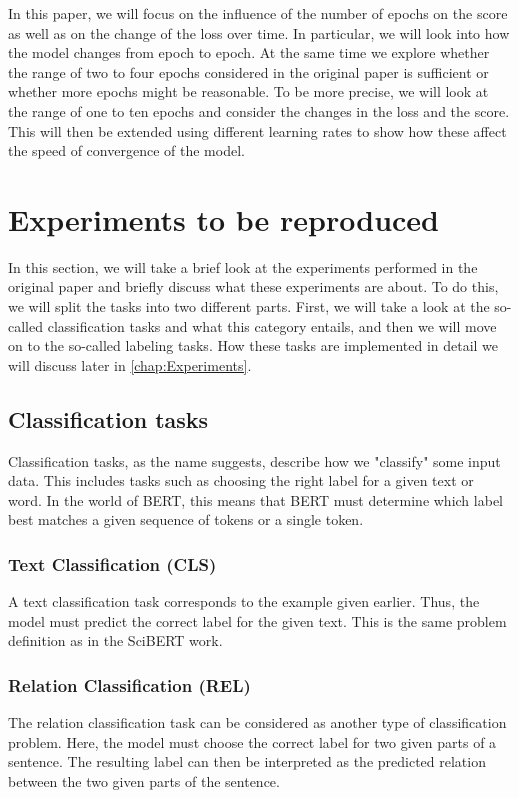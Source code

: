 \color{red}
In this paper, we will focus on the influence of the number of epochs on the score as well as on the change of the loss over time. In particular, we will look into how the model changes from epoch to epoch. At the same time we explore whether the range of two to four epochs considered in the original paper is sufficient or whether more epochs might be reasonable. To be more precise, we will look at the range of one to ten epochs and consider the changes in the loss and the score. This will then be extended using different learning rates to show how these affect the speed of convergence of the model. 
\color{black}

\section{Experiments to be reproduced}
In this section, we will take a brief look at the experiments performed in the original paper and briefly discuss what these experiments are about. To do this, we will split the tasks into two different parts. First, we will take a look at the so-called classification tasks and what this category entails, and then we will move on to the so-called labeling tasks. How these tasks are implemented in detail we will discuss later in \autoref{chap:Experiments}.
\subsection{Classification tasks}
Classification tasks, as the name suggests, describe how we "classify" some input data. This includes tasks such as choosing the right label for a given text or word. In the world of BERT, this means that BERT must determine which label best matches a given sequence of tokens or a single token. 
\subsubsection{Text Classification (CLS)}
A text classification task corresponds to the example given earlier. Thus, the model must predict the correct label for the given text. This is the same problem definition as in the SciBERT work.
\subsubsection{Relation Classification (REL)}
The relation classification task can be considered as another type of classification problem. Here, the model must choose the correct label for two given parts of a sentence. The resulting label can then be interpreted as the predicted relation between the two given parts of the sentence.
